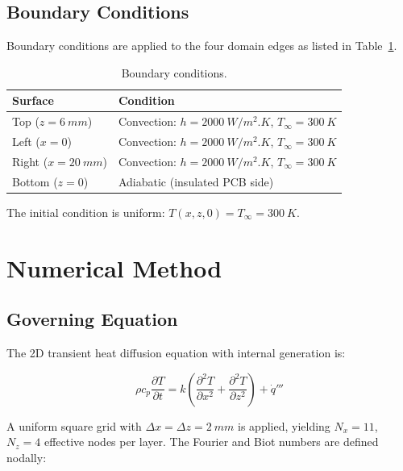 \documentclass[10pt,twocolumn]{article}
\begin{document}
\subsection{Boundary Conditions}

Boundary conditions are applied to the four domain edges as listed in
Table~\ref{tab:bc}.

\begin{table}[H]
  \centering
  \caption{Boundary conditions.}
  \label{tab:bc}
  \small
  \begin{tabular}{@{}ll@{}}
    \toprule
    Surface & Condition \\
    \midrule
    Top ($z = \SI{6}{mm}$)    & Convection: $h = \SI{2000}{W/m^2.K}$, $T_\infty = \SI{300}{K}$ \\
    Left ($x = 0$)             & Convection: $h = \SI{2000}{W/m^2.K}$, $T_\infty = \SI{300}{K}$ \\
    Right ($x = \SI{20}{mm}$)  & Convection: $h = \SI{2000}{W/m^2.K}$, $T_\infty = \SI{300}{K}$ \\
    Bottom ($z = 0$)           & Adiabatic (insulated PCB side) \\
    \bottomrule
  \end{tabular}
\end{table}

The initial condition is uniform: $T(x,z,0) = T_\infty = \SI{300}{K}$.

\section{Numerical Method}

\subsection{Governing Equation}

The 2D transient heat diffusion equation with internal generation is:

\begin{equation}
  \rho c_p \frac{\partial T}{\partial t}
  = k \left(\frac{\partial^2 T}{\partial x^2}
           + \frac{\partial^2 T}{\partial z^2}\right)
    + \dot{q}'''
  \label{eq:gov}
\end{equation}

A uniform square grid with $\Delta x = \Delta z = \SI{2}{mm}$ is applied,
yielding $N_x = 11$, $N_z = 4$ effective nodes per layer. The Fourier and
Biot numbers are defined nodally:
\end{document}
